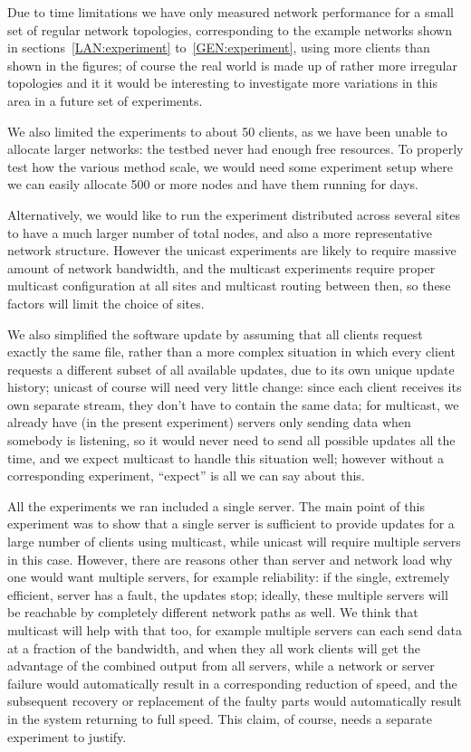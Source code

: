 \documentclass[a4paper,11pt,twocolumn]{article}
\begin{document}
Due to time limitations we have only measured network performance for
a small set of regular network topologies, corresponding to the example
networks shown in sections~\ref{LAN:experiment} to~\ref{GEN:experiment},
using more clients than shown in the figures; of course the real world
is made up of rather more irregular topologies and it it would be
interesting to investigate more variations in this area in a future set
of experiments.

We also limited the experiments to about 50 clients, as we have been
unable to allocate larger networks: the testbed never had enough free
resources.  To properly test how the various method scale, we would need
some experiment setup where we can easily allocate 500 or more nodes
and have them running for days.

Alternatively, we would like to run the experiment distributed across
several sites to have a much larger number of total nodes, and also a
more representative network structure.  However the unicast experiments
are likely to require massive amount of network bandwidth, and the
multicast experiments require proper multicast configuration at all
sites and multicast routing between then, so these factors will limit
the choice of sites.

We also simplified the software update by assuming that all clients
request exactly the same file, rather than a more complex situation
in which every client requests a different subset of all available
updates, due to its own unique update history; unicast of course
will need very little change: since each client receives its own
separate stream, they don't have to contain the same data; for
multicast, we already have (in the present experiment) servers only
sending data when somebody is listening, so it would never need to
send all possible updates all the time, and we expect multicast
to handle this situation well; however without a corresponding
experiment, ``expect'' is all we can say about this.

All the experiments we ran included a single server.  The main point
of this experiment was to show that a single server is sufficient to
provide updates for a large number of clients using multicast, while
unicast will require multiple servers in this case.  However, there
are reasons other than server and network load why one would want
multiple servers, for example reliability: if the single, extremely
efficient, server has a fault, the updates stop; ideally, these
multiple servers will be reachable by completely different network
paths as well.  We think that multicast will help with that too,
for example multiple servers can each send data at a fraction of the
bandwidth, and when they all work clients will get the advantage of the
combined output from all servers, while a network or server failure
would automatically result in a corresponding reduction of speed, and
the subsequent recovery or replacement of the faulty parts would
automatically result in the system returning to full speed.  This
claim, of course, needs a separate experiment to justify.
\end{document}
